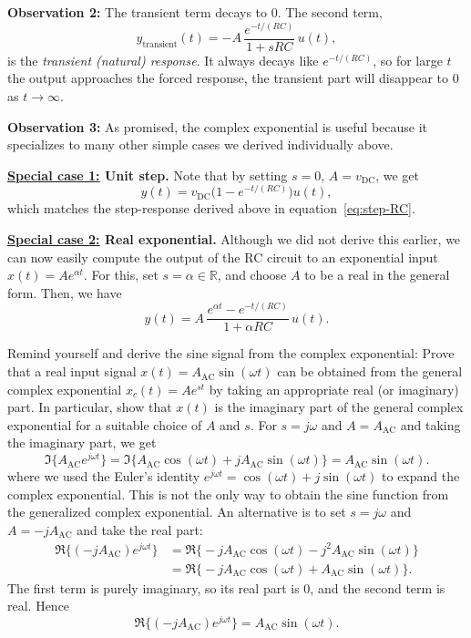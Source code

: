 \documentclass{ee102_notes}
\begin{document}
\textbf{Observation 2:} The transient term decays to 0. The second term,
  \[
  y_{\text{transient}}(t)=-A\,\frac{e^{-t/(RC)}}{1+sRC}\,u(t),
  \]
  is the \emph{transient (natural) response}. It always decays like $e^{-t/(RC)}$, so for large $t$ the output approaches the forced response, the transient part will disappear to 0 as $t\to\infty$.

\textbf{Observation 3:} As promised, the complex exponential is useful because it specializes to many other simple cases we derived individually above.

\textbf{\ul{Special case 1:} Unit step.} Note that by setting $s=0$, $A=v_{\text{DC}}$, we get 
    \[
    y(t)=v_{\text{DC}}\big(1-e^{-t/(RC)}\big)u(t),
    \]
    which matches the step-response derived above in equation~\eqref{eq:step-RC}.

\textbf{\ul{Special case 2:} Real exponential.} Although we did not derive this earlier, we can now easily compute the output of the RC circuit to an exponential input $x(t) = Ae^{\alpha t}$. For this, set $s=\alpha\in\mathbb{R}$, and choose $A$ to be a real in the general form. Then, we have
    \[
    y(t)=A\,\frac{e^{\alpha t}-e^{-t/(RC)}}{1+\alpha RC}\,u(t).
    \]

\begin{popquiz} 
Remind yourself and derive the sine signal from the complex exponential: Prove that a real input signal $x(t)=A_{\text{AC}}\sin(\omega t)$ can be obtained from the general complex exponential $x_c(t)=A e^{st}$ by taking an appropriate real (or imaginary) part. In particular, show that $x(t)$ is the imaginary part of the general complex exponential for a suitable choice of $A$ and $s$. 
\popqsplit
For $s = j\omega$ and $A = A_{\text{AC}}$ and taking the imaginary part, we get
\[
\Im\!\big\{A_{\text{AC}}e^{j\omega t}\big\}
=\Im\!\big\{A_{\text{AC}}\cos(\omega t)+jA_{\text{AC}}\sin(\omega t)\big\}
=A_{\text{AC}}\sin(\omega t).
\]
where we used the Euler's identity $e^{j\omega t}=\cos(\omega t)+j\sin(\omega t)$ to expand the complex exponential. This is not the only way to obtain the sine function from the generalized complex exponential. An alternative is to set $s=j\omega$ and $A=-jA_{\text{AC}}$ and take the real part:
\begin{align*}
\Re\!\big\{(-jA_{\text{AC}})e^{j\omega t}\big\}
&=\Re\!\big\{-jA_{\text{AC}}\cos(\omega t)-j^2A_{\text{AC}}\sin(\omega t)\big\}\\
&=\Re\!\big\{-jA_{\text{AC}}\cos(\omega t)+A_{\text{AC}}\sin(\omega t)\big\}.
\end{align*}
The first term is purely imaginary, so its real part is $0$, and the second term is real. Hence
\[
\Re\!\big\{(-jA_{\text{AC}})e^{j\omega t}\big\}
= A_{\text{AC}}\sin(\omega t).
\]
\end{popquiz}
\end{document}
